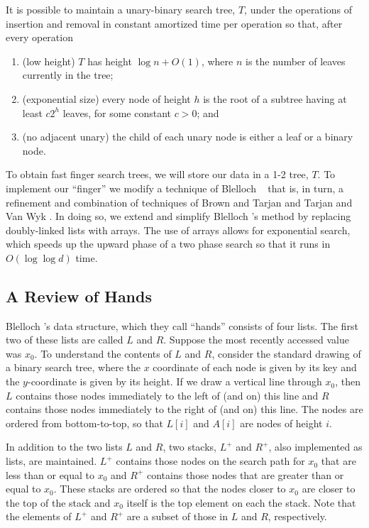 \documentclass{patmorin}
\begin{document}
\begin{thm}[Fagerberg]
  It is possible to maintain a unary-binary search tree, $T$, under the
  operations of insertion and removal in constant amortized time per
  operation so that, after every operation
  \begin{enumerate}
    \item(low height) $T$ has height $\log n + O(1)$, where $n$ is the
      number of leaves currently in the tree;
    \item(exponential size) every node of height $h$ is the root of a
      subtree having at least $c2^h$ leaves, for some constant $c>0$; and
    \item(no adjacent unary) the child of each unary node is either 
      a leaf or a binary node.
   \end{enumerate}
\end{thm}

To obtain fast finger search trees, we will store our data in a 1-2 tree,
$T$.  To implement our ``finger'' we modify a technique of Blelloch \etal\
\cite{S} that is, in turn, a refinement and combination of techniques
of Brown and Tarjan \cite{S} and Tarjan and Van Wyk \cite{S}. In doing
so, we extend and simplify Blelloch \etal's method by replacing
doubly-linked lists with arrays.  The use of arrays allows for exponential search, which speeds up the upward phase of a two phase search so that it runs in $O(\log\log d)$ time.

\subsection{A Review of Hands}

Blelloch \etal's data structure, which they call ``hands'' consists
of four lists.  The first two of these lists are called $L$ and $R$.
Suppose the most recently accessed value was $x_0$. To understand the
contents of $L$ and $R$, consider the standard drawing of a binary search
tree, where the $x$ coordinate of each node is given by its key and the
$y$-coordinate is given by its height.  If we draw a vertical line through
$x_0$, then $L$ contains those nodes immediately to the left of (and on)
this line and $R$ contains those nodes immediately to the right of (and
on) this line.  The nodes are ordered from bottom-to-top, so that $L[i]$
and $A[i]$ are nodes of height $i$.

In addition to the two lists $L$ and $R$, two stacks, $L^+$ and $R^+$,
also implemented as lists, are maintained. $L^+$ contains those nodes
on the search path for $x_0$ that are less than or equal to $x_0$ and
$R^+$ contains those nodes that are greater than or equal to $x_0$.
These stacks are ordered so that the nodes closer to $x_0$ are closer
to the top of the stack and $x_0$ itself is the top element on each the
stack. Note that the elements of $L^+$ and $R^+$ are a subset of those
in $L$ and $R$, respectively.
\end{document}
